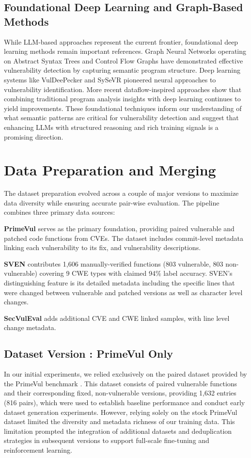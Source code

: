 \documentclass[12pt,a4paper]{article}
\makeatletter
\newcounter{DataVer}
\newcommand{\dataversion}[2]{%
  \stepcounter{DataVer}%
  \subsection{Dataset Version \theDataVer: #1}%
  \protected@edef\@currentlabel{\theDataVer}\label{#2}%
}
\makeatother
\begin{document}
\subsection{Foundational Deep Learning and Graph-Based Methods}

While LLM-based approaches represent the current frontier, foundational deep learning methods remain important references. Graph Neural Networks operating on Abstract Syntax Trees and Control Flow Graphs \cite{devign} have demonstrated effective vulnerability detection by capturing semantic program structure. Deep learning systems like VulDeePecker \cite{VulDeePecker_paper} and SySeVR \cite{SySeVR_paper} pioneered neural approaches to vulnerability identification. More recent dataflow-inspired approaches \cite{deepdfa} show that combining traditional program analysis insights with deep learning continues to yield improvements. These foundational techniques inform our understanding of what semantic patterns are critical for vulnerability detection and suggest that enhancing LLMs with structured reasoning and rich training signals is a promising direction.

\section{Data Preparation and Merging}

The dataset preparation evolved across a couple of major versions to maximize data diversity while ensuring accurate pair-wise evaluation. The pipeline combines three primary data sources:

\textbf{PrimeVul} serves as the primary foundation, providing paired vulnerable and patched code functions from CVEs. The dataset includes commit-level metadata linking each vulnerability to its fix, and vulnerability descriptions.

\textbf{SVEN} contributes 1,606 manually-verified functions (803 vulnerable, 803 non-vulnerable) covering 9 CWE types with claimed 94\% label accuracy. SVEN's distinguishing feature is its detailed metadata including the specific lines that were changed between vulnerable and patched versions as well as character level changes.

\textbf{SecVulEval} adds additional CVE and CWE linked samples, with line level change metadata.

\dataversion{PrimeVul Only}{ver:data_sem2_primevulonly}
In our initial experiments, we relied exclusively on the paired dataset provided by the PrimeVul benchmark \cite{primevul}. This dataset consists of paired vulnerable functions and their corresponding fixed, non-vulnerable versions, providing 1,632 entries (816 pairs), which were used to establish baseline performance and conduct early dataset generation experiments. However, relying solely on the stock PrimeVul dataset limited the diversity and metadata richness of our training data. This limitation prompted the integration of additional datasets and deduplication strategies in subsequent versions to support full-scale fine-tuning and reinforcement learning.
\end{document}
